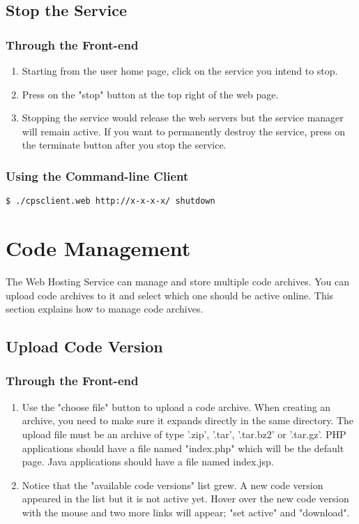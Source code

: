 \documentclass[10pt]{article}
\newenvironment{framedbox}[1]%
{\begin{framed}
 \begingroup
 \fontsize{#1}{#1}\selectfont
}
{
 \endgroup
 \end{framed}
}
\begin{document}
\subsection{Stop the Service}
\subsubsection{Through the Front-end}
\begin{enumerate}
\item Starting from the user home page, click on the service you intend to stop.
\item Press on the "stop" button at the top right of the web page.
\item Stopping the service would release the web servers but the service
      manager will remain active. If you want to permanently destroy the
      service, press on the terminate button after you stop the service.
\end{enumerate}
\subsubsection{Using the Command-line Client}
\begin{framedbox}{8pt}\begin{verbatim}
$ ./cpsclient.web http://x-x-x-x/ shutdown
\end{verbatim}\end{framedbox}

\section{Code Management}
The Web Hosting Service can manage and store multiple code archives. You can
upload code archives to it and select which one should be active online.
This section explains how to manage code archives.

\subsection{Upload Code Version}
\subsubsection{Through the Front-end}
\begin{enumerate}
\item Use the "choose file" button to upload a code archive. When creating an
      archive, you need to make sure it expands directly in the same directory.
      The upload file must be an archive of type '.zip', '.tar', '.tar.bz2' or
      '.tar.gz'. PHP applications should have a file named "index.php"
      which will be the default page. Java applications should have a file
      named index.jsp.
\item Notice that the "available code versions" list grew. A new code version
      appeared in the list but it is not active yet. Hover over the new code
      version with the mouse and two more links will appear; "set active" and
      "download".
\end{enumerate}
\end{document}
